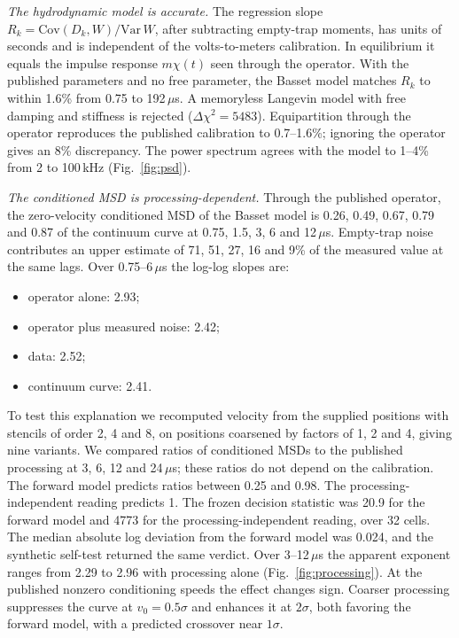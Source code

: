 \documentclass[aps,pre,10pt,twocolumn,superscriptaddress,amsmath,amssymb]{revtex4-2}
\begin{document}
\emph{The hydrodynamic model is accurate.} The regression slope $R_k=\mathrm{Cov}(D_k,W)/\mathrm{Var}\,W$, after subtracting empty-trap moments, has units of seconds and is independent of the volts-to-meters calibration. In equilibrium it equals the impulse response $m\chi(t)$ seen through the operator. With the published parameters and no free parameter, the Basset model matches $R_k$ to within 1.6\% from 0.75 to 192\,$\mu$s. A memoryless Langevin model with free damping and stiffness is rejected ($\Delta\chi^2=5483$). Equipartition through the operator reproduces the published calibration to 0.7--1.6\%; ignoring the operator gives an 8\% discrepancy. The power spectrum agrees with the model to 1--4\% from 2 to 100\,kHz (Fig.~\ref{fig:psd}).

\emph{The conditioned MSD is processing-dependent.} Through the published operator, the zero-velocity conditioned MSD of the Basset model is 0.26, 0.49, 0.67, 0.79 and 0.87 of the continuum curve at 0.75, 1.5, 3, 6 and 12\,$\mu$s. Empty-trap noise contributes an upper estimate of 71, 51, 27, 16 and 9\% of the measured value at the same lags. Over 0.75--6\,$\mu$s the log-log slopes are:
\begin{itemize}
\item operator alone: 2.93;
\item operator plus measured noise: 2.42;
\item data: 2.52;
\item continuum curve: 2.41.
\end{itemize}
To test this explanation we recomputed velocity from the supplied positions with stencils of order 2, 4 and 8, on positions coarsened by factors of 1, 2 and 4, giving nine variants. We compared ratios of conditioned MSDs to the published processing at 3, 6, 12 and 24\,$\mu$s; these ratios do not depend on the calibration. The forward model predicts ratios between 0.25 and 0.98. The processing-independent reading predicts 1. The frozen decision statistic was 20.9 for the forward model and 4773 for the processing-independent reading, over 32 cells. The median absolute log deviation from the forward model was 0.024, and the synthetic self-test returned the same verdict. Over 3--12\,$\mu$s the apparent exponent ranges from 2.29 to 2.96 with processing alone (Fig.~\ref{fig:processing}). At the published nonzero conditioning speeds the effect changes sign. Coarser processing suppresses the curve at $v_0=0.5\sigma$ and enhances it at $2\sigma$, both favoring the forward model, with a predicted crossover near $1\sigma$.
\end{document}
